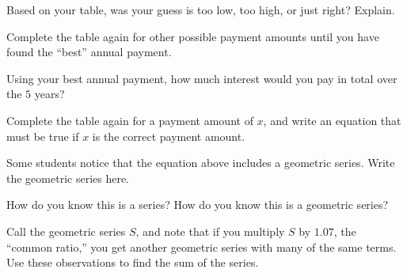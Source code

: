 \documentclass[,nooutcomes]{ximera}
\begin{document}
\begin{question}
Based on your table, was your guess is too low, too high, or just right?  Explain.  
\end{question}

\begin{question}
Complete the table again for other possible payment amounts until you have found the ``best'' annual payment.  
\begin{freeResponse}
\end{freeResponse}
\end{question}

\begin{question}
Using your best annual payment, how much interest would you pay in total over the $5$ years? 
\begin{freeResponse}
\end{freeResponse}
\end{question}

\begin{question}
Complete the table again for a payment amount of $x$, and write an equation that must be true if $x$ is the correct
payment amount.   
\begin{freeResponse}
\end{freeResponse}
\end{question}

\begin{question}
Some students notice that the equation above includes a geometric series.  Write the geometric series here.
\begin{freeResponse}
\end{freeResponse}
\end{question}

\begin{question}
How do you know this is a series?  How do you know this is a geometric series?   
\begin{freeResponse}
\end{freeResponse}
\end{question}

\begin{question}
Call the geometric series $S$, and note that if you multiply $S$ by $1.07$, the ``common ratio,'' you get another geometric series with many of the same terms.  Use these observations to find the sum of the series.   
\begin{freeResponse}
\end{freeResponse}
\end{question}
\end{document}
